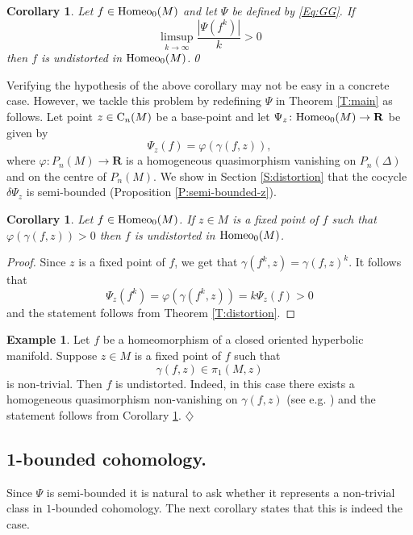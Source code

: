 \documentclass[11pt]{amsart}
\newtheorem{corollary}[subsection]{Corollary}
\theoremstyle{definition}
\newtheorem{example}[subsection]{Example}
\theoremstyle{remark}
\numberwithin{equation}{section}
\numberwithin{figure}{section}
\newcommand{\B}[1]{{\mathbf #1}}
\begin{document}
\begin{corollary}\label{C:distortion}
Let $f\in {\rm Homeo}_0(M)$ and let $\Psi$ be defined by \eqref{Eq:GG}. If
$$
\limsup_{k\to \infty}\frac{|\Psi(f^k)|}{k}>0
$$
then $f$ is undistorted in ${\rm Homeo}_0(M)$.\qed
\end{corollary}

Verifying the hypothesis of the above corollary may not be easy in a concrete case.
However, we tackle this problem by redefining $\Psi$ in Theorem \ref{T:main} as follows. Let point
$z\in {\rm C}_n(M)$ be a base-point and let $\Psi_z\colon {\rm Homeo}_0(M)\to \B R$
be given by
$$
\Psi_z(f) = \varphi(\gamma(f,z)),
$$
where $\varphi\colon P_n(M)\to \B R$ is a homogeneous quasimorphism vanishing on $P_n(\Delta)$
and on the centre of $P_n(M)$. We show in Section \ref{S:distortion} that
the cocycle $\delta\Psi_z$ is semi-bounded (Proposition \ref{P:semi-bounded-z}).

\begin{corollary}\label{C:distortion-fix}
Let $f\in {\rm Homeo}_0(M)$. If $z\in M$ is a fixed point of $f$ such that
$\varphi(\gamma(f,z))>0$ then $f$ is undistorted in ${\rm Homeo}_0(M)$.
\end{corollary}

\begin{proof}
Since $z$ is a fixed point of $f$, we get that $\gamma(f^k,z) = \gamma(f,z)^k$.
It follows that 
$$\Psi_z(f^k)=\varphi(\gamma(f^k,z)) = k\Psi_z(f)>0$$ 
and the statement follows from Theorem \ref{T:distortion}.
\end{proof}

\begin{example}\label{E:hyperbolic}
Let $f$ be a homeomorphism of a closed oriented hyperbolic manifold. 
Suppose $z\in M$ is a fixed point of $f$ such that 
$$\gamma(f,z)\in \pi_1(M,z)$$
is non-trivial. Then $f$ is undistorted. Indeed, in this case there
exists a homogeneous quasimorphism non-vanishing on $\gamma(f,z)$ (see e.g. \cite{zbMATH06532523}) and
the statement follows from Corollary \ref{C:distortion}.
\hfill $\diamondsuit$
\end{example}


\subsection*{1-bounded cohomology.}
Since $\Psi$ is semi-bounded it is natural to ask whether it
represents a non-trivial class in $1$-bounded cohomology.
The next corollary states that this is indeed the case.
\end{document}
